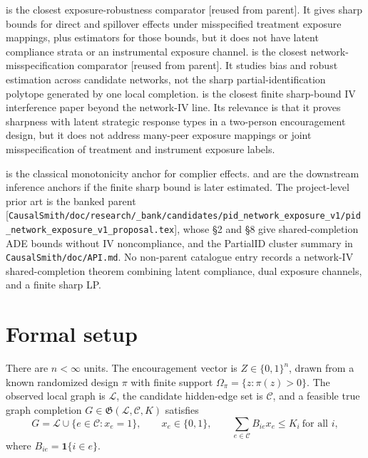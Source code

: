 \documentclass[11pt]{article}
\newcommand{\one}{\mathbf{1}}
\theoremstyle{definition}
\theoremstyle{plain}
\theoremstyle{remark}
\begin{document}
\citet{schroder_oprescu_feuerriegel_kallus_2026_networks_partialid} is the closest exposure-robustness comparator [reused from parent]. It gives sharp bounds for direct and spillover effects under misspecified treatment exposure mappings, plus estimators for those bounds, but it does not have latent compliance strata or an instrumental exposure channel. \citet{weinstein_nevo_2026_misspecified_networks} is the closest network-misspecification comparator [reused from parent]. It studies bias and robust estimation across candidate networks, not the sharp partial-identification polytope generated by one local completion. \citet{acerenza_martinez_iriarte_sanchez_becerra_spini_2025_household_bounds} is the closest finite sharp-bound IV interference paper beyond the network-IV line. Its relevance is that it proves sharpness with latent strategic response types in a two-person encouragement design, but it does not address many-peer exposure mappings or joint misspecification of treatment and instrument exposure labels.

\citet{imbens_angrist_1994_late} is the classical monotonicity anchor for complier effects. \citet{imbens_manski_2004_ci_partial_id} and \citet{chernozhukov_hong_tamer_2007_parameter_sets} are the downstream inference anchors if the finite sharp bound is later estimated. The project-level prior art is the banked parent [\texttt{CausalSmith/doc/research/\_bank/candidates/pid\_network\_exposure\_v1/pid\_network\_exposure\_v1\_proposal.tex}], whose \S2 and \S8 give shared-completion ADE bounds without IV noncompliance, and the PartialID cluster summary in \texttt{CausalSmith/doc/API.md}. No non-parent catalogue entry records a network-IV shared-completion theorem combining latent compliance, dual exposure channels, and a finite sharp LP.

\section{Formal setup}
There are \(n<\infty\) units. The encouragement vector is \(Z\in\{0,1\}^n\), drawn from a known randomized design \(\pi\) with finite support \(\Omega_\pi=\{z:\pi(z)>0\}\). The observed local graph is \(\mathcal L\), the candidate hidden-edge set is \(\mathcal C\), and a feasible true graph completion \(G\in\mathfrak G(\mathcal L,\mathcal C,K)\) satisfies
\[
G=\mathcal L\cup\{e\in\mathcal C:x_e=1\}, \qquad x_e\in\{0,1\}, \qquad \sum_{e\in\mathcal C}B_{ie}x_e\le K_i \ \text{for all } i,
\]
where \(B_{ie}=\one\{i\in e\}\).
\end{document}
